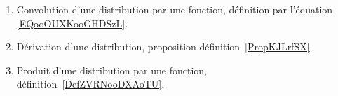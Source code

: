 
	\label{THEMEooDistributionsOperations}
\begin{enumerate}
	\item
	      Convolution d'une distribution par une fonction, définition par l'équation \eqref{EQooOUXKooGHDSzL}.
	\item
	      Dérivation d'une distribution, proposition-définition~\ref{PropKJLrfSX}.
	\item
	      Produit d'une distribution par une fonction, définition~\ref{DefZVRNooDXAoTU}.
\end{enumerate}
